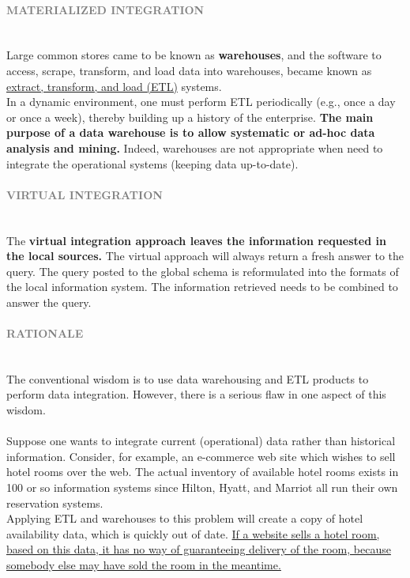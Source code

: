 \documentclass[10pt,a4paper]{article}
\newcommand{\nline}{\\~\\}
\newcommand{\myparagraph}[1]{\paragraph{\normalsize{\textcolor{gray}{\uppercase{\textbf{#1}}}} }\mbox{} \vspace{0.5em}\\}
\begin{document}
\raggedright
\myparagraph{Materialized Integration}
Large common stores came to be known as \textbf{warehouses}, and the software to access, scrape, transform, and load data into warehouses, became known as \uline{extract, transform, and load (ETL)} systems. \\ In a dynamic environment, one must perform ETL periodically (e.g., once a day or once a week), thereby building up a history of the enterprise. \textbf{The main purpose of a data warehouse is to allow systematic or ad-hoc data analysis and mining.} Indeed, warehouses are not appropriate when need to integrate the operational systems (keeping data up-to-date).
\myparagraph{Virtual Integration}
The \textbf{virtual integration approach leaves the information requested in the local sources.} The virtual approach will always return a fresh answer to the query. The query posted to the global schema is reformulated into the formats of the local information system. The information retrieved needs to be combined to answer the query.
\myparagraph{Rationale}
The conventional wisdom is to use data warehousing and ETL products to perform data integration. However, there is a serious flaw in one aspect of this wisdom. \nline
Suppose one wants to integrate current (operational) data rather than historical information. Consider, for example, an e-commerce web site which wishes to sell hotel rooms over the web. The actual inventory of available hotel rooms exists in 100 or so information systems since Hilton, Hyatt, and Marriot all run their own reservation systems.\\ Applying ETL and warehouses to this problem will create a copy of hotel availability data, which is quickly out of date. \uline{If a website sells a hotel room, based on this data, it has no way of guaranteeing delivery of the room, because somebody else may have sold the room in the meantime.}
\end{document}
